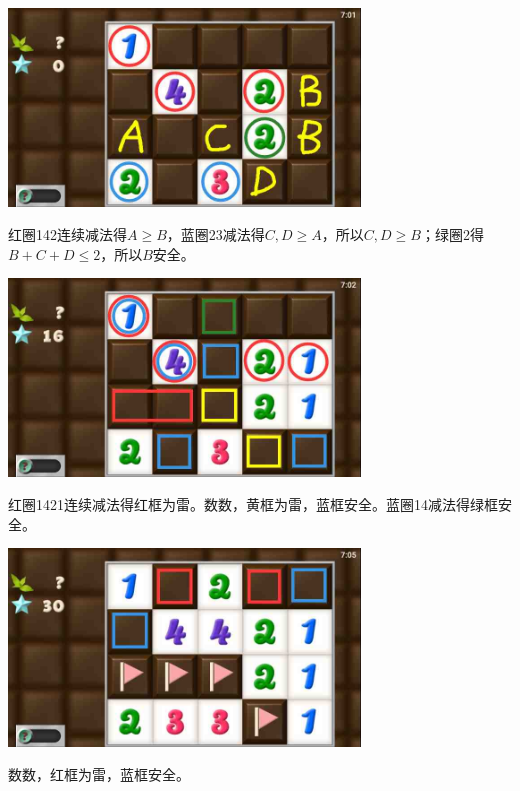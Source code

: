 \subsection{} %
\begin{center}
    \includegraphics[width=0.7\textwidth]{puzzlelow/197-1.jpg}
\end{center}
红圈142连续减法得$A\ge B$，蓝圈23减法得$C,D\ge A$，所以$C,D\ge B$；绿圈2得$B+C+D\le 2$，所以$B$安全。
\begin{center}
    \includegraphics[width=0.7\textwidth]{puzzlelow/197-2.jpg}
\end{center}
红圈1421连续减法得红框为雷。数数，黄框为雷，蓝框安全。蓝圈14减法得绿框安全。
\begin{center}
    \includegraphics[width=0.7\textwidth]{puzzlelow/197-3.jpg}
\end{center}
数数，红框为雷，蓝框安全。

